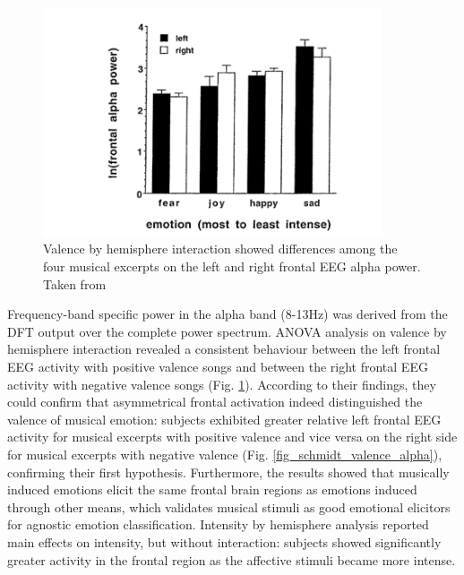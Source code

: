 \begin{figure}[ht!]
\includegraphics[width=10cm]{img/related_work/valence_hemisphere.png}
\centering
\caption{Valence by hemisphere interaction showed differences among the four musical excerpts on the left and right frontal EEG alpha power. Taken from \cite{schmidt_frontal_2001}}\label{fig_schmidt_valence_emo}
\end{figure}
Frequency-band specific power in the alpha band (8-13Hz) was derived from the \ac{DFT} output over the complete power spectrum. ANOVA analysis on valence by hemisphere interaction revealed a consistent behaviour between the left frontal EEG activity with positive valence songs and between the right frontal \ac{EEG} activity with negative valence songs (Fig. \ref{fig_schmidt_valence_emo}).
According to their findings, they could confirm that asymmetrical frontal activation indeed distinguished the valence of musical emotion: subjects exhibited greater relative left frontal EEG activity for musical excerpts with positive valence and vice versa on the right side for musical excerpts with negative valence (Fig. \ref{fig_schmidt_valence_alpha}), confirming their first hypothesis. Furthermore, the results showed that musically induced emotions elicit the same frontal brain regions as emotions induced through other means, which validates musical stimuli as good emotional elicitors for agnostic emotion classification. Intensity by hemisphere analysis reported main effects on intensity, but without interaction: subjects showed significantly greater activity in the frontal region as the affective stimuli became more intense. 

